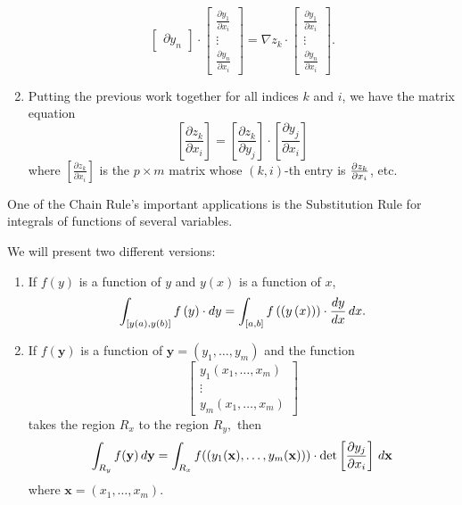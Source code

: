 \documentclass[handout]{ximera}
\begin{document}
\begin{theorem}
\begin{enumerate}
\[\begin{bmatrix}
{    \partial y_{n}}%
  \end{bmatrix}
  \cdot
  \begin{bmatrix}
    \frac{\partial y_{1}}{\partial x_{i}} \\ 
    \vdots \\ 
    \frac{\partial y_{n}}{\partial x_{i}}%
  \end{bmatrix}
  =\nabla z_{k}\cdot
  \begin{bmatrix}
    \frac{\partial y_{1}}{\partial x_{i}} \\ 
    \vdots \\ 
    \frac{\partial y_{n}}{\partial x_{i}}%
  \end{bmatrix}. 
  \]
  
\item Putting the previous work together for all indices $k$ and $i$,
  we have the matrix equation%
  \[
  \left[ \frac{\partial z_{k}}{\partial x_{i}}\right] =\left[ \frac{\partial
      z_{k}}{\partial y_{j}}\right] \cdot\left[ \frac{\partial y_{j}}{\partial
      x_{i}}\right]   \label{ChR}
  \]
  where $\left[ \frac{\partial z_{k}}{\partial x_{i}}\right] $ is the $p\times
  m$ matrix whose $(k,i)$-th entry is $\frac{\partial z_{k}}{%
    \partial x_{i}}$, etc.
  \end{enumerate}
\end{theorem}

One of the Chain Rule's important applications is the Substitution Rule
for integrals of functions of several variables.

\begin{theorem} We will present two different versions:
  \begin{enumerate}
  \item If $f\left( y\right) $ is a function of $y$
    and $y\left( x\right) $ is a function of $x$,%
    \[
    \int \nolimits_{\left[ y\left( a\right) ,y\left( b\right) \right] }f\left(
    y\right) \cdot dy=\int \nolimits_{\left[ a,b\right] }f\left( \left( y\left(
    x\right) \right) \right) \cdot\frac{dy}{dx} \,d x. 
    \]
    
  \item If $f(\mathbf{y}) $ is a function of $\mathbf{y} = \left(
    y_{1},\ldots ,y_{m}\right) $ and the function
    \[
    \begin{bmatrix}
      y_{1}(x_{1},\ldots ,x_{m}) \\
      \vdots\\
      y_{m}( x_{1},\ldots,x_{m})
    \end{bmatrix}
    \]
    takes the region $R_{x}$ to the region $R_{y},$ then%
    \[
    \int_{R_{y}}f(\mathbf{y})  \,d \mathbf{y}
    =\int_{R_{x}}f(( y_{1}(\mathbf{x}) ,\ldots ,y_{m}(\mathbf{x}) )
    ) \cdot \det\left[\frac{\partial y_{j}}{\partial x_{i}}\right]
    \,d \mathbf{x}
      \]
      where $\mathbf{x} = (x_{1},\ldots,x_{m})$.
  \end{enumerate}
\end{theorem}
\end{document}
